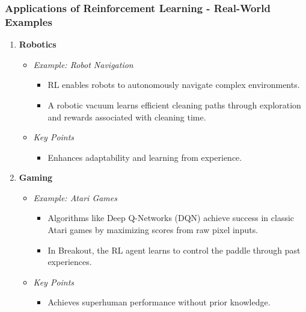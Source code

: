 \documentclass[aspectratio=169]{beamer}
\begin{document}
\begin{frame}[fragile]
    \frametitle{Applications of Reinforcement Learning - Real-World Examples}
    \begin{enumerate}
        \item \textbf{Robotics} 
        \begin{itemize}
            \item \textit{Example: Robot Navigation}
            \begin{itemize}
                \item RL enables robots to autonomously navigate complex environments.
                \item A robotic vacuum learns efficient cleaning paths through exploration and rewards associated with cleaning time.
            \end{itemize}
            \item \textit{Key Points}
            \begin{itemize}
                \item Enhances adaptability and learning from experience.
            \end{itemize}
        \end{itemize}

        \item \textbf{Gaming}
        \begin{itemize}
            \item \textit{Example: Atari Games}
            \begin{itemize}
                \item Algorithms like Deep Q-Networks (DQN) achieve success in classic Atari games by maximizing scores from raw pixel inputs.
                \item In Breakout, the RL agent learns to control the paddle through past experiences.
            \end{itemize}
            \item \textit{Key Points}
            \begin{itemize}
                \item Achieves superhuman performance without prior knowledge.
            \end{itemize}
        \end{itemize}
        

\end{enumerate}
\end{frame}
\end{document}
